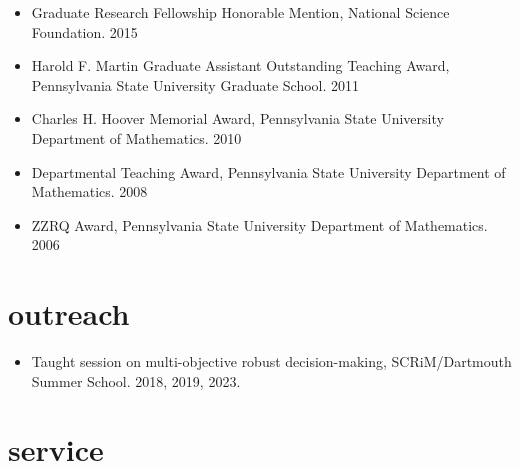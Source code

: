 \documentclass[11pt,article,oneside]{memoir}
\begin{document}
\mbox{}\vspace{-\dimexpr\baselineskip\relax}

\begin{itemize}[label={}]

\item Graduate Research Fellowship Honorable Mention, National Science Foundation. 2015

\item Harold F. Martin Graduate Assistant Outstanding Teaching Award, Pennsylvania State University Graduate School. 2011

\item Charles H. Hoover Memorial Award, Pennsylvania State University Department of Mathematics. 2010

\item Departmental Teaching Award, Pennsylvania State University Department of Mathematics. 2008

\item ZZRQ Award, Pennsylvania State University Department of Mathematics. 2006

\end{itemize}


\section{outreach}

\mbox{}\vspace{-\dimexpr\baselineskip\relax}

\begin{itemize}[label={}]

\item Taught session on multi-objective robust decision-making, SCRiM/Dartmouth Summer School. 2018, 2019, 2023.

\end{itemize}


\section{service}

\mbox{}\vspace{-\dimexpr\baselineskip\relax}
\end{document}
